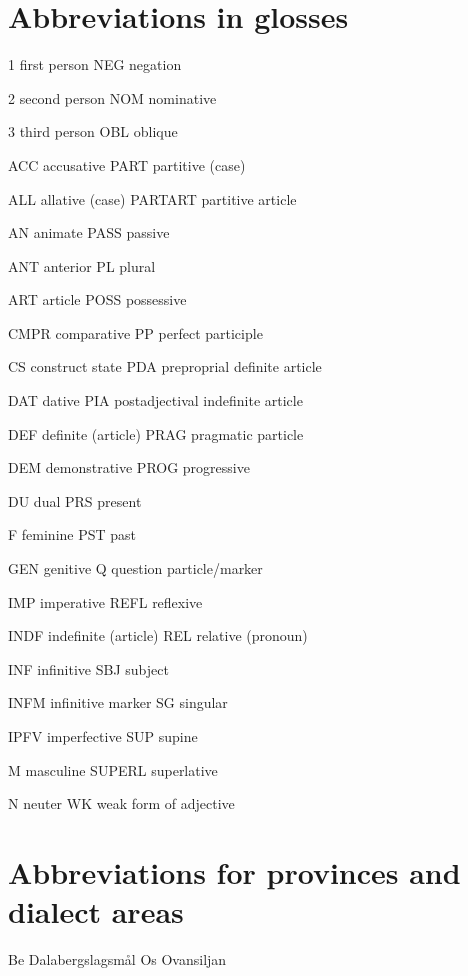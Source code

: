 
\chapter{Abbreviations in glosses\footnotemark{}}

1  first person  NEG  negation

2  second person  NOM  nominative

3  third person  OBL  oblique

ACC  accusative  PART  partitive (case)

ALL  allative (case)  PARTART  partitive article

AN  animate  PASS  passive

ANT  anterior  PL  plural

ART  article  POSS  possessive

CMPR  comparative  PP  perfect participle

CS  construct state  PDA  preproprial definite article

DAT  dative  PIA  postadjectival indefinite article

DEF  definite (article)  PRAG  pragmatic particle

DEM  demonstrative  PROG  progressive

DU  dual  PRS  present

F  feminine  PST  past

GEN  genitive  Q  question particle/marker

IMP  imperative  REFL  reflexive

INDF  indefinite (article)  REL  relative (pronoun)

INF  infinitive  SBJ  subject

INFM  infinitive marker  SG  singular

IPFV  imperfective  SUP  supine

M  masculine  SUPERL  superlative

N  neuter  WK  weak form of adjective


\chapter{Abbreviations for provinces and dialect areas}

Be  Dalabergslagsmål  Os  Ovansiljan

